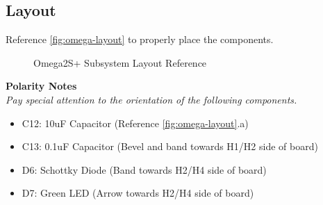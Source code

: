 \documentclass{article}
\begin{document}
\subsection{Layout}

Reference \autoref{fig:omega-layout} to properly place the components.

\begin{figure}[H]
    \centering
        \qquad
        \caption{Omega2S+ Subsystem Layout Reference}%
    \label{fig:omega-layout}%
\end{figure}

\noindent \textbf{Polarity Notes}\\
\noindent \textit{Pay special attention to the orientation of the following components.}
\begin{itemize}
  \item C12: 10uF Capacitor (Reference \autoref{fig:omega-layout}.a)
  \item C13: 0.1uF Capacitor (Bevel and band towards H1/H2 side of board)
  \item D6: Schottky Diode (Band towards H2/H4 side of board) 
  \item D7: Green LED (Arrow towards H2/H4 side of board)
\end{itemize}
\end{document}
